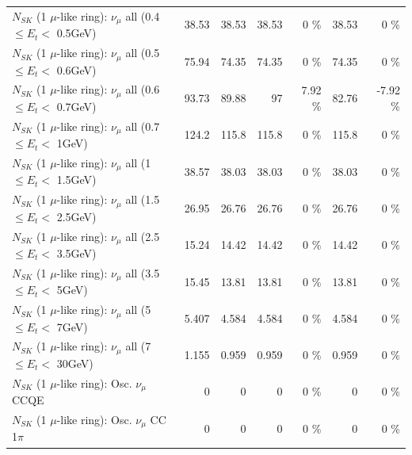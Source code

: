 \begin{table}
\begin{tabular}{| l | r | r | r  r | r  r |}
       $N_{SK}$ (1 $\mu$-like ring): $\nu_{\mu}$ all (0.4 $\leq E_{t} <$ 0.5GeV) &           38.53 &           38.53 &           38.53 &        0 \%  &           38.53 &        0 \%  \\ 
       $N_{SK}$ (1 $\mu$-like ring): $\nu_{\mu}$ all (0.5 $\leq E_{t} <$ 0.6GeV) &           75.94 &           74.35 &           74.35 &        0 \%  &           74.35 &        0 \%  \\ 
       $N_{SK}$ (1 $\mu$-like ring): $\nu_{\mu}$ all (0.6 $\leq E_{t} <$ 0.7GeV) &           93.73 &           89.88 &              97 &     7.92 \%  &           82.76 &    -7.92 \%  \\ 
         $N_{SK}$ (1 $\mu$-like ring): $\nu_{\mu}$ all (0.7 $\leq E_{t} <$ 1GeV) &           124.2 &           115.8 &           115.8 &        0 \%  &           115.8 &        0 \%  \\ 
         $N_{SK}$ (1 $\mu$-like ring): $\nu_{\mu}$ all (1 $\leq E_{t} <$ 1.5GeV) &           38.57 &           38.03 &           38.03 &        0 \%  &           38.03 &        0 \%  \\ 
       $N_{SK}$ (1 $\mu$-like ring): $\nu_{\mu}$ all (1.5 $\leq E_{t} <$ 2.5GeV) &           26.95 &           26.76 &           26.76 &        0 \%  &           26.76 &        0 \%  \\ 
       $N_{SK}$ (1 $\mu$-like ring): $\nu_{\mu}$ all (2.5 $\leq E_{t} <$ 3.5GeV) &           15.24 &           14.42 &           14.42 &        0 \%  &           14.42 &        0 \%  \\ 
         $N_{SK}$ (1 $\mu$-like ring): $\nu_{\mu}$ all (3.5 $\leq E_{t} <$ 5GeV) &           15.45 &           13.81 &           13.81 &        0 \%  &           13.81 &        0 \%  \\ 
           $N_{SK}$ (1 $\mu$-like ring): $\nu_{\mu}$ all (5 $\leq E_{t} <$ 7GeV) &           5.407 &           4.584 &           4.584 &        0 \%  &           4.584 &        0 \%  \\ 
          $N_{SK}$ (1 $\mu$-like ring): $\nu_{\mu}$ all (7 $\leq E_{t} <$ 30GeV) &           1.155 &           0.959 &           0.959 &        0 \%  &           0.959 &        0 \%  \\ 
\hline
\hline
                               $N_{SK}$ (1 $\mu$-like ring): Osc. $\nu_\mu$ CCQE &               0 &               0 &               0 &        0 \%  &               0 &        0 \%  \\ 
                          $N_{SK}$ (1 $\mu$-like ring): Osc. $\nu_\mu$ CC 1$\pi$ &               0 &               0 &               0 &        0 \%  &               0 &        0 \%  \\ 

\end{tabular}
\end{table}
